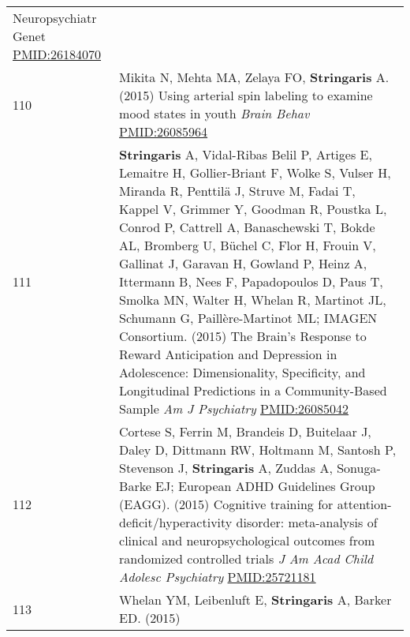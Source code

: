 \documentclass[
]{article}
\begin{document}
\begin{longtable}[]{@{}ll@{}}
\begin{minipage}[t]{0.94\columnwidth}
{Neuropsychiatr Genet} \url{PMID:26184070}\strut
\end{minipage}\tabularnewline
\begin{minipage}[t]{0.01\columnwidth}\raggedright
110\strut
\end{minipage} & \begin{minipage}[t]{0.94\columnwidth}\raggedright
Mikita N, Mehta MA, Zelaya FO, \textbf{Stringaris} A. (2015) Using
arterial spin labeling to examine mood states in youth \emph{Brain
Behav} \url{PMID:26085964}\strut
\end{minipage}\tabularnewline
\begin{minipage}[t]{0.01\columnwidth}\raggedright
111\strut
\end{minipage} & \begin{minipage}[t]{0.94\columnwidth}\raggedright
\textbf{Stringaris} A, Vidal-Ribas Belil P, Artiges E, Lemaitre H,
Gollier-Briant F, Wolke S, Vulser H, Miranda R, Penttilä J, Struve M,
Fadai T, Kappel V, Grimmer Y, Goodman R, Poustka L, Conrod P, Cattrell
A, Banaschewski T, Bokde AL, Bromberg U, Büchel C, Flor H, Frouin V,
Gallinat J, Garavan H, Gowland P, Heinz A, Ittermann B, Nees F,
Papadopoulos D, Paus T, Smolka MN, Walter H, Whelan R, Martinot JL,
Schumann G, Paillère-Martinot ML; IMAGEN Consortium. (2015) The Brain's
Response to Reward Anticipation and Depression in Adolescence:
Dimensionality, Specificity, and Longitudinal Predictions in a
Community-Based Sample \emph{Am J Psychiatry} \url{PMID:26085042}\strut
\end{minipage}\tabularnewline
\begin{minipage}[t]{0.01\columnwidth}\raggedright
112\strut
\end{minipage} & \begin{minipage}[t]{0.94\columnwidth}\raggedright
Cortese S, Ferrin M, Brandeis D, Buitelaar J, Daley D, Dittmann RW,
Holtmann M, Santosh P, Stevenson J, \textbf{Stringaris} A, Zuddas A,
Sonuga-Barke EJ; European ADHD Guidelines Group (EAGG). (2015) Cognitive
training for attention-deficit/hyperactivity disorder: meta-analysis of
clinical and neuropsychological outcomes from randomized controlled
trials \emph{J Am Acad Child Adolesc Psychiatry}
\url{PMID:25721181}\strut
\end{minipage}\tabularnewline
\begin{minipage}[t]{0.01\columnwidth}\raggedright
113\strut
\end{minipage} & \begin{minipage}[t]{0.94\columnwidth}\raggedright
Whelan YM, Leibenluft E, \textbf{Stringaris} A, Barker ED. (2015)

\end{minipage}
\end{longtable}
\end{document}
